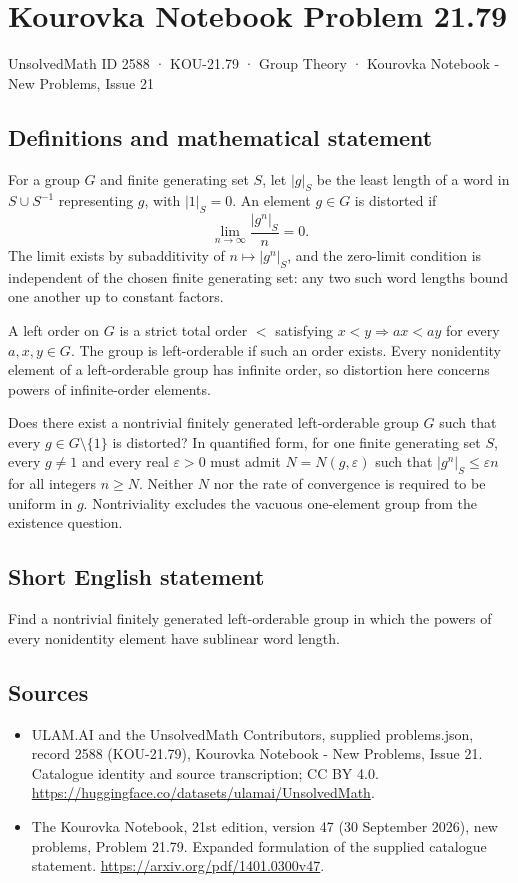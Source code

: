 \documentclass[11pt,a4paper]{article}
\begin{document}
\section*{Kourovka Notebook Problem 21.79}\label{2588}
{\small UnsolvedMath ID 2588 · KOU-21.79 · Group Theory · Kourovka Notebook - New Problems, Issue 21}
\subsection{Definitions and mathematical statement}
For a group $G$ and finite generating set $S$, let $|g|_S$ be the least length of a word in $S\cup S^{-1}$ representing $g$, with $|1|_S=0$. An element $g\in G$ is distorted if
\[
 \lim_{n\to\infty}\frac{|g^n|_S}{n}=0.
\]
The limit exists by subadditivity of $n\mapsto|g^n|_S$, and the zero-limit condition is independent of the chosen finite generating set: any two such word lengths bound one another up to constant factors.

A left order on $G$ is a strict total order $<$ satisfying $x<y\Rightarrow ax<ay$ for every $a,x,y\in G$. The group is left-orderable if such an order exists. Every nonidentity element of a left-orderable group has infinite order, so distortion here concerns powers of infinite-order elements.

Does there exist a nontrivial finitely generated left-orderable group $G$ such that every $g\in G\setminus\{1\}$ is distorted? In quantified form, for one finite generating set $S$, every $g\ne1$ and every real $\varepsilon>0$ must admit $N=N(g,\varepsilon)$ such that $|g^n|_S\le\varepsilon n$ for all integers $n\ge N$. Neither $N$ nor the rate of convergence is required to be uniform in $g$. Nontriviality excludes the vacuous one-element group from the existence question.
\subsection{Short English statement}
Find a nontrivial finitely generated left-orderable group in which the powers of every nonidentity element have sublinear word length.
\subsection{Sources}
\begin{itemize}
\item[S1] ULAM.AI and the UnsolvedMath Contributors, supplied problems.json, record 2588 (KOU-21.79), Kourovka Notebook - New Problems, Issue 21. Catalogue identity and source transcription; CC BY 4.0.
\url{https://huggingface.co/datasets/ulamai/UnsolvedMath}.
\item[S2] The Kourovka Notebook, 21st edition, version 47 (30 September 2026), new problems, Problem 21.79. Expanded formulation of the supplied catalogue statement.
\url{https://arxiv.org/pdf/1401.0300v47}.
\end{itemize}
\end{document}
